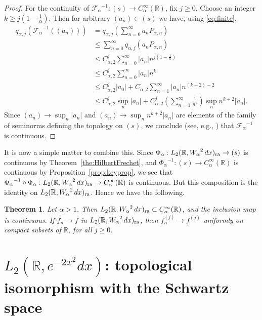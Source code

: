\documentclass[12pt, reqno]{amsart}
\numberwithin{equation}{section}
\theoremstyle{plain}
\newtheorem{theorem}{Theorem}[section]
\theoremstyle{definition}
\begin{document}
\begin{proof}
For the continuity of ${\mathcal F_\alpha}^{-1}:(s)\to{{C_\alpha^\infty({{\mathbb R}})}}$, fix $j\geq 0$. Choose an integer $k\geq j\left(1-\frac{1}{\alpha}\right)$. Then for arbitrary ${({a_n})}\in (s)$ we have, using \eqref{eq:finite},
\begin{align*}
{q_{\alpha, j}}\left({\mathcal F_\alpha}^{-1}({({a_n})}) \right)&={q_{\alpha, j}}\left(\sum_{n=0}^\infty a_n P_{\alpha,n}\right)\\
&\leq \sum_{n=0}^\infty{q_{\alpha, j}} (a_n P_{\alpha,n})\\
&\leq C_{\alpha,2}^j\sum_{n=0}^\infty |a_n|n^{j\left(1-\frac{1}{\alpha}\right)}\\
&\leq C_{\alpha,2}^j\sum_{n=0}^\infty |a_n|n^k\\
&\leq C_{\alpha,2}^j |a_0| + C_{\alpha,2}\sum_{n=1}^\infty |a_n| n^{(k+2)-2}\\
&\leq C_{\alpha,2}^j\sup_n |a_n| + C_{\alpha,2}^j\left(\sum_{n=1}^\infty \frac{1}{n^2}\right)\sup_n n^{k+2}|a_n |.
\end{align*}
Since ${({a_n})}\to\sup_n|a_n|$ and ${({a_n})}\to\sup_n n^{k+2}|a_n|$ are elements of the family of seminorms defining the topology on $(s)$, we conclude (see, e.g., \cite[Proposition~1.2.8]{KaRi}) that ${\mathcal F_\alpha}^{-1}$ is continuous.
\end{proof}

It is now a simple matter to combine this. Since ${{{\Phi}}_\alpha}:{L_2({{\mathbb R}},{W_\alpha}^2\,dx)_{\textup{ra}}}\to (s)$ is continuous by Theorem~\ref{the:HilbertFrechet}, and ${{{\Phi}}_\alpha}^{-1}:(s)\to {{C_\alpha^\infty({{\mathbb R}})}}$ is continuous by Proposition~\ref{prop:keyprop}, we see that ${{{\Phi}}_\alpha}^{-1}\circ{{{\Phi}}_\alpha}: {L_2({{\mathbb R}},{W_\alpha}^2\,dx)_{\textup{ra}}}\to{{C_\alpha^\infty({{\mathbb R}})}}$ is continuous. But this composition is the identity on ${L_2({{\mathbb R}},{W_\alpha}^2\,dx)_{\textup{ra}}}$. Hence we have the following.

\begin{theorem}\label{the:regularityandtopology}
Let $\alpha>1$. Then ${L_2({{\mathbb R}},{W_\alpha}^2\,dx)_{\textup{ra}}}\subset{{C_\alpha^\infty({{\mathbb R}})}}$, and the inclusion map is continuous. If $f_n\to f$ in ${L_2({{\mathbb R}},{W_\alpha}^2\,dx)_{\textup{ra}}}$, then $f_n^{(j)}\to f^{(j)}$ uniformly on  compact subsets of ${{\mathbb R}}$, for all $j\geq 0$.
\end{theorem}

\section{${L_2({{\mathbb R}}, e^{-2x^2}dx)}$: topological isomorphism with the Schwartz space}\label{sec:alphaistwo}
\end{document}
